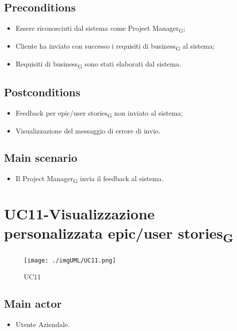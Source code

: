 \documentclass{article}
\begin{document}
   \subsection*{Preconditions}
        \begin{itemize}
            \item Essere riconosciuti dal sistema come Project Manager\textsubscript{G};
            \item Cliente ha inviato con successo i requisiti di business\textsubscript{G} al sistema;
            \item Requisiti di business\textsubscript{G} sono stati elaborati dal sistema.
        \end{itemize}
        
    \subsection*{Postconditions}
        \begin{itemize}
            \item Feedback per epic/user stories\textsubscript{G} non inviato al sistema;
            \item Visualizzazione del messaggio di errore di invio.
        \end{itemize} 
        \subsection*{Main scenario}
        \begin{itemize}
            \item Il Project Manager\textsubscript{G} invia il feedback al sistema.
        \end{itemize}

  
\section{UC11-Visualizzazione personalizzata epic/user stories\textsubscript{G}}
    \begin{figure}[h]
      \centering
      \texttt{[image: ./imgUML/UC11.png]}
        \caption{UC11}
      \label{fig:UC11}
    \end{figure}
    
    \subsection*{Main actor}
        \begin{itemize}
            \item Utente Aziendale.
        \end{itemize}
        
\end{document}
